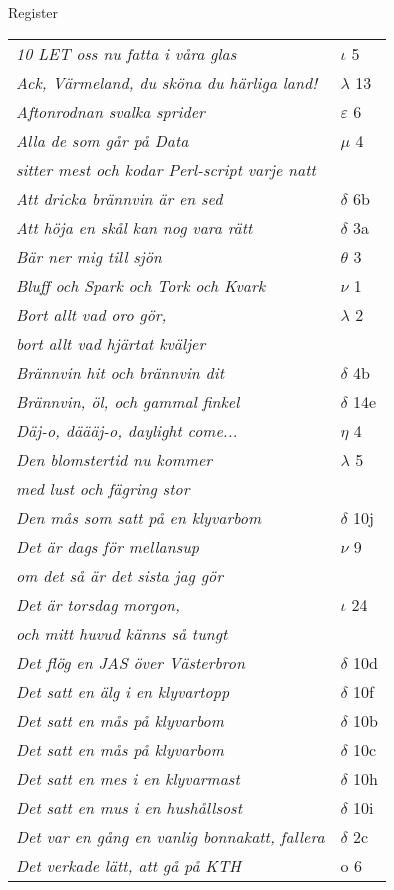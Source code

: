 \documentclass[a6paper,10pt]{article}
\begin{document}
\noindent\Large Register
\begin{table}[!h]
\begin{tabular}{l l}
\textit{10 LET oss nu fatta i våra glas}	&$\iota$ 5\\
\textit{Ack, Värmeland, du sköna du härliga land!}	&$\lambda$ 13\\
\textit{Aftonrodnan svalka sprider}	&$\varepsilon$ 6\\
\textit{Alla de som går på Data}	&$\mu$ 4\\
\textit{sitter mest och kodar Perl-script varje natt}&\\
\textit{Att dricka brännvin är en sed}	&$\delta$ 6b\\
\textit{Att höja en skål kan nog vara rätt}	&$\delta$ 3a\\
\textit{Bär ner mig till sjön}	&$\theta$ 3\\
\textit{Bluff och Spark och Tork och Kvark}	&$\nu$ 1\\
\textit{Bort allt vad oro gör,}	&$\lambda$ 2\\
\textit{bort allt vad hjärtat kväljer}&\\
\textit{Brännvin hit och brännvin dit}	&$\delta$ 4b\\
\textit{Brännvin, öl, och gammal finkel}	&$\delta$ 14e\\
\textit{Däj-o, däääj-o, daylight come...}	&$\eta$ 4\\
\textit{Den blomstertid nu kommer}	&$\lambda$ 5\\
\textit{med lust och fägring stor}&\\
\textit{Den mås som satt på en klyvarbom}	&$\delta$ 10j\\
\textit{Det är dags för mellansup}	&$\nu$ 9\\
\textit{om det så är det sista jag gör}&\\
\textit{Det är torsdag morgon,}&$\iota$ 24\\
\textit{och mitt huvud känns så tungt}&\\
\textit{Det flög en JAS över Västerbron}	&$\delta$ 10d\\
\textit{Det satt en älg i en klyvartopp}	&$\delta$ 10f\\
\textit{Det satt en mås på klyvarbom}	&$\delta$ 10b\\
\textit{Det satt en mås på klyvarbom}	&$\delta$ 10c\\
\textit{Det satt en mes i en klyvarmast}	&$\delta$ 10h\\
\textit{Det satt en mus i en hushållsost}	&$\delta$ 10i\\
\textit{Det var en gång en vanlig bonnakatt, fallera}	&$\delta$ 2c\\
\textit{Det verkade lätt, att gå på KTH}     &o 6\\
\end{tabular}
\end{table}
\end{document}
